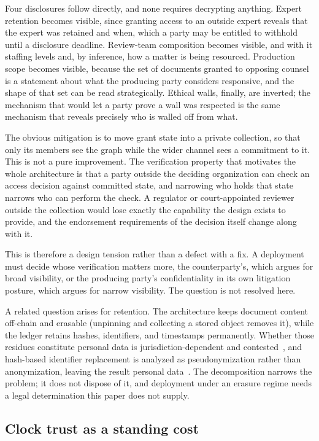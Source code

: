 \documentclass[preprint,12pt]{elsarticle}
\begin{document}
Four disclosures follow directly, and none requires decrypting anything.
Expert retention becomes visible, since granting access to an outside expert
reveals that the expert was retained and when, which a party may be entitled
to withhold until a disclosure deadline. Review-team composition becomes
visible, and with it staffing levels and, by inference, how a matter is being
resourced. Production scope becomes visible, because the set of documents
granted to opposing counsel is a statement about what the producing party
considers responsive, and the shape of that set can be read strategically.
Ethical walls, finally, are inverted; the mechanism that would let a party
prove a wall was respected is the same mechanism that reveals precisely who is
walled off from what.

The obvious mitigation is to move grant state into a private collection, so
that only its members see the graph while the wider channel sees a commitment
to it. This is not a pure improvement. The verification property that
motivates the whole architecture is that a party outside the deciding
organization can check an access decision against committed state, and
narrowing who holds that state narrows who can perform the check. A regulator
or court-appointed reviewer outside the collection would lose exactly the
capability the design exists to provide, and the endorsement requirements of
the decision itself change along with it.

This is therefore a design tension rather than a defect with a fix. A
deployment must decide whose verification matters more, the counterparty's,
which argues for broad visibility, or the producing party's confidentiality in
its own litigation posture, which argues for narrow visibility. The question
is not resolved here.

A related question arises for retention. The architecture keeps document
content off-chain and erasable (unpinning and collecting a stored object
removes it), while the ledger retains hashes, identifiers, and timestamps
permanently. Whether those residues constitute personal data is
jurisdiction-dependent and contested~\cite{gdpr2016,lyons2018integration}, and
hash-based identifier replacement is analyzed as pseudonymization rather than
anonymization, leaving the result personal
data~\cite{Finck2020,EDPB2025Pseudonymisation}. The decomposition narrows the
problem; it does not dispose of it, and deployment under an erasure regime
needs a legal determination this paper does not supply.

\subsection{Clock trust as a standing cost}
\label{sec:clocktrustprice}
\end{document}
